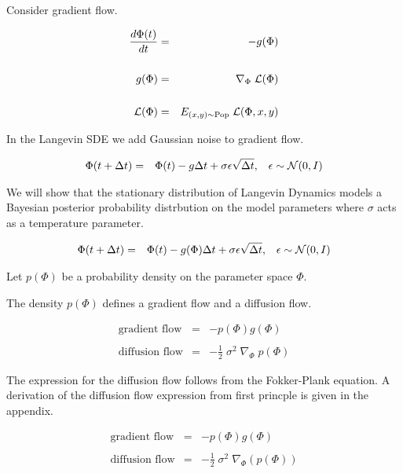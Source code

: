 {

Consider gradient flow.

\begin{eqnarray*}
\frac{d\Phi(t)}{dt} & = & - g(\Phi) \\
\\
g(\Phi) & = & \nabla_\Phi\;{\cal L}(\Phi) \\
\\
{\cal L}(\Phi) & = & E_{(x,y) \sim \mathrm{Pop}}\;{\cal L}(\Phi,x,y)
\end{eqnarray*}


In the Langevin SDE we add Gaussian noise to gradient flow.

\begin{eqnarray*}
\Phi(t + \Delta t) & = & \Phi(t) - g\Delta t + \sigma \epsilon \sqrt{\Delta t},\;\;\;\epsilon \sim {\cal N}(0,I)
\end{eqnarray*}

\vfill
We will show that the stationary distribution of Langevin Dynamics models a Bayesian posterior probability distrbution on
the model parameters where $\sigma$ acts as a temperature parameter.



\begin{eqnarray*}
\Phi(t + \Delta t) & = & \Phi(t) - g(\Phi)\Delta t + \sigma\epsilon \sqrt{\Delta t},\;\;\;\epsilon \sim {\cal N}(0,I)
\end{eqnarray*}

Let $p(\Phi)$ be a probability density on the parameter space $\Phi$.

\vfill
The density $p(\Phi)$ defines a gradient flow and a diffusion flow.

\begin{eqnarray*}
\mbox{gradient flow} & = & - p(\Phi)g(\Phi) \\
\\
\mbox{diffusion flow} & = & - \frac{1}{2} \;\sigma^2\;\nabla_\Phi\; p(\Phi)
\end{eqnarray*}

\vfill
The expression for the diffusion flow follows from the Fokker-Plank equation. A derivation of the diffusion flow expression from first princple is given in the appendix.


\begin{eqnarray*}
\mbox{gradient flow} & = & - p(\Phi)g(\Phi) \\
\\
\mbox{diffusion flow} & = & - \frac{1}{2} \;\sigma^2\;\nabla_\Phi(p(\Phi))
\end{eqnarray*}

}
